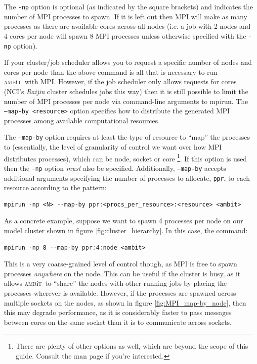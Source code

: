 \documentclass{report}
\newcommand{\ambit}{\textsc{amb}{\footnotesize i}\textsc{t}}
\begin{document}
The \texttt{-np} option is optional (as indicated by the square brackets) and indicates the number of MPI
processes to spawn. If it is left out then MPI will make as many processes as there are available cores
across all nodes (i.e. a job with 2 nodes and 4 cores per node will spawn 8 MPI processes unless
otherwise specified with the \texttt{-np} option).

If your cluster/job scheduler allows you to request a specific number of nodes and cores per node
than the above command is all that is necessary to run \ambit ~with MPI. However, if the job scheduler
only allows requests for cores (NCI's \textit{Raijin} cluster schedules jobs this way) then it is still
possible to limit the number of MPI processes per node via command-line arguments to mpirun. The
\texttt{--map-by <resource>} option specifies how to distribute the generated MPI processes among
available computational resources.

The \texttt{--map-by} option requires at least the type of resource to ``map'' the processes to
(essentially, the level of granularity of control we want over how MPI distributes processes), which can
be node, socket or core \footnote{There are plenty of other options as well, which are beyond the
scope of this guide. Consult the man page if you're interested.}. If this option is used then the
\texttt{-np} option \textit{must} also be specified. Additionally, \texttt{--map-by} accepts
additional arguments specifying the number of processes to allocate, \texttt{ppr}, to each resource 
according to the pattern:

\begin{verbatim}
mpirun -np <N> --map-by ppr:<procs_per_resource>:<resource> <ambit>
\end{verbatim}

As a concrete example, suppose we want to spawn 4 processes per node on our model cluster shown in 
figure \ref{fig:cluster_hierarchy}. In this case, the command:

\begin{verbatim}
mpirun -np 8 --map-by ppr:4:node <ambit>
\end{verbatim}

This is a very coarse-grained level of control though, as MPI is free to spawn processes \emph{anywhere} 
on the node. This can be useful if the cluster is busy, as it allows \ambit ~to ``share'' the nodes with
other running jobs by placing the processes wherever is available. However, if the processes are spawned
across multiple sockets on the nodes, as shown in figure \ref{fig:MPI_map-by_node}, then this may degrade
performance, as it is considerably faster to pass messages
between cores on the same socket than it is to communicate across sockets.
\end{document}
